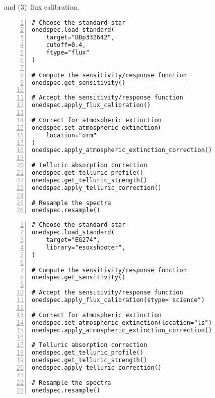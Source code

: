 and (3)~flux calibration.

\vspace*{1em}

\noindent
\begin{minipage}{0.45\linewidth}
\begin{Verbatim}[frame=topline,numbers=left,label=LT/SPRAT,framesep=3mm]
# Choose the standard star
onedspec.load_standard(
    target="BDp332642",
    cutoff=0.4,
    ftype="flux"
)

# Compute the sensitivity/response function
onedspec.get_sensitivity()

# Accept the sensitivity/response function
onedspec.apply_flux_calibration()

# Correct for atmospheric extinction
onedspec.set_atmospheric_extinction(
    location="orm"
)
onedspec.apply_atmospheric_extinction_correction()

# Telluric absorption correction
onedspec.get_telluric_profile()
onedspec.get_telluric_strength()
onedspec.apply_telluric_correction()

# Resample the spectra
onedspec.resample()

\end{Verbatim}
\end{minipage}\hfill
\begin{minipage}{0.45\linewidth}
\begin{Verbatim}[frame=topline,numbers=left,label=Gemini/GMOS,framesep=3mm]
# Choose the standard star
onedspec.load_standard(
    target="EG274",
    library="esoxshooter",
)

# Compute the sensitivity/response function
onedspec.get_sensitivity()

# Accept the sensitivity/response function
onedspec.apply_flux_calibration(stype="science")

# Correct for atmospheric extinction
onedspec.set_atmospheric_extinction(location="ls")
onedspec.apply_atmospheric_extinction_correction()

# Telluric absorption correction
onedspec.get_telluric_profile()
onedspec.get_telluric_strength()
onedspec.apply_telluric_correction()

# Resample the spectra
onedspec.resample()

\end{Verbatim}
\end{minipage}
